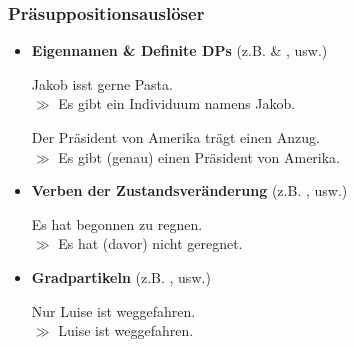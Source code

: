 
\begin{frame}
\frametitle{Präsuppositionsauslöser}

\begin{itemize}
	\item \textbf{Eigennamen \& Definite DPs} (z.B.  \& , usw.)
	
	\ea Jakob isst gerne Pasta. \\ $\gg$ Es gibt ein Individuum namens Jakob.
	\z
	
	\ea Der Präsident von Amerika trägt einen Anzug.\\ $\gg$ Es gibt (genau) einen Präsident von Amerika.
	\z
	

%	
	
	\item \textbf{Verben der Zustandsveränderung} (z.B. , usw.)

	\ea Es hat begonnen zu regnen.\\
			$\gg$ Es hat (davor) nicht geregnet.
	\z
	
	\item \textbf{Gradpartikeln} (z.B. , usw.)
	
	\ea Nur Luise ist weggefahren. \\
			$\gg$ Luise ist weggefahren.
	\z		

\end{itemize}

\end{frame}



